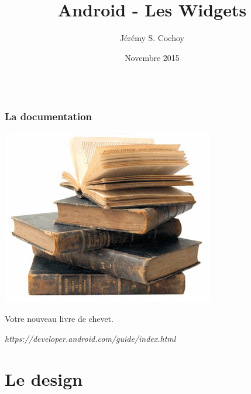 \documentclass{beamer}
\begin{document}
\title{Android - Les Widgets}
\author{Jérémy S. Cochoy}
\date{Novembre 2015}


\begin{frame}
\titlepage
\end{frame}

\begin{frame}
  \begin{columns}[t]
  \begin{column}{5cm}
  \tableofcontents[sections={1-3}]
  \end{column}
  \begin{column}{5cm}
  \tableofcontents[sections={4-8}]
  \end{column}
  \end{columns}
\end{frame}

\begin{frame}
\frametitle{La documentation}
\begin{center}
\includegraphics[scale=0.5]{livres.png}
\end{center}
\begin{block}{Votre nouveau livre de chevet.}
\begin{center}
\emph{https://developer.android.com/guide/index.html}
\end{center}
\end{block}

\end{frame}

\section{Le design}
\end{document}

